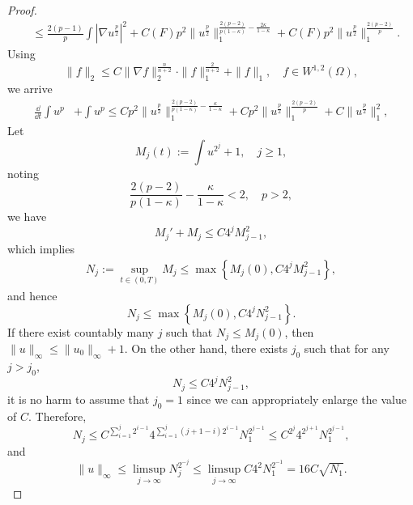 \begin{proof}
\begin{align*}
		&\leq \frac{2(p-1)}{p}\int |\nabla u^{\frac{p}{2}}|^2 
			+ C(F)p^2\|u^{\frac{p}{2}}\|_1^{\frac{2(p-2)}{p(1-\kappa)}-\frac{2\kappa}{1-\kappa}}
			+ C(F)p^2\|u^{\frac{p}{2}}\|_1^{\frac{2(p-2)}{p}}.
	\end{align*}
	Using 
	\[
		\|f\|_2\leq C\|\nabla f\|_2^{\frac{n}{n+2}}\cdot\|f\|_1^{\frac{2}{n+2}} + \|f\|_1,\quad f\in W^{1,2}(\Omega),
	\]
	we arrive 
	\begin{align*}
		\frac{\dd}{\dd t}\int u^p &+ \int  u^{p}
			\leq Cp^2 \|u^{\frac{p}{2}}\|_1^{\frac{2(p-2)}{p(1-\kappa)}-\frac{\kappa}{1-\kappa}}
				+ Cp^2\|u^{\frac{p}{2}}\|_1^{\frac{2(p-2)}{p}}
				+ C\|u^{\frac{p}{2}}\|_1^2,
	\end{align*}
	Let
	\[
		M_j(t) := \int u^{2^j} + 1, \quad j\geq1,
	\]
	noting 
	\[
		\frac{2(p-2)}{p(1-\kappa)}-\frac{\kappa}{1-\kappa} < 2,\quad p>2,
	\]
	we have 
	\[
		M_j' + M_j \leq C4^jM_{j-1}^2,
	\]
	which implies 
	\begin{align*}
		N_j := \sup_{t\in(0,T)}M_j \leq \max\left\{ M_j(0), C4^jM_{j-1}^2\right\},
	\end{align*}
	and hence
	\[
		N_j \leq \max\left\{ M_j(0), C4^jN_{j-1}^2\right\}.
	\]
	If there exist countably many $j$ such that $N_j \leq M_j(0)$, 
	then $\|u\|_\infty \leq \|u_0\|_\infty + 1$.
	On the other hand, there exists $j_0$ such that for any $j>j_0$, 
	\[
		N_j \leq C4^jN_{j-1}^2,
	\]
	it is no harm to assume that $j_0=1$ since we can appropriately enlarge the value of $C$.
	Therefore,
	\[
		N_j\leq C^{\sum_{i=1}^j2^{i-1}}4^{\sum_{i=1}^{j}(j+1-i)2^{i-1}}N_1^{2^{j-1}}
			\leq C^{2^j}4^{2^{j+1}}N_1^{2^{j-1}},
	\]
	and 
	\[
		\|u\|_\infty\leq\limsup_{j\to\infty}N_j^{2^{-j}}
			\leq\limsup_{j\to\infty}C4^2N_1^{2^{-1}}=16C\sqrt{N_1}.
	\]
\end{proof}
